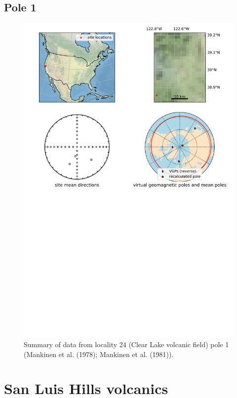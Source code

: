 \documentclass{article}
\begin{document}
\subsection{Pole 1}


\begin{figure}[H]
\centering
\includegraphics[width=5 in]{./24/1/pole_summary.png}
\caption{Summary of data from locality 24 (Clear Lake volcanic field) pole 1 (Mankinen et al. (1978); Mankinen et al. (1981)).}
\end{figure}

\section{San Luis Hills volcanics}
\end{document}
